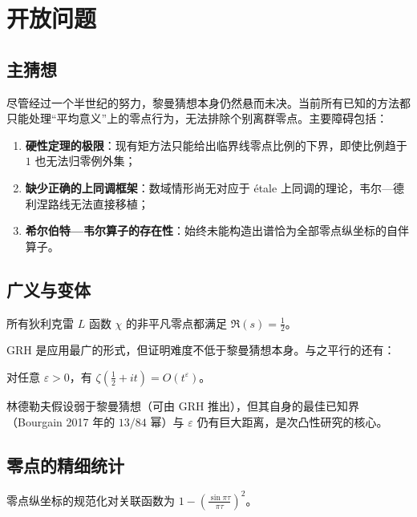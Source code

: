 \section{开放问题}\label{sec:open_problems}

\subsection{主猜想}

尽管经过一个半世纪的努力，黎曼猜想本身仍然悬而未决。当前所有已知的方法都只能处理“平均意义”上的零点行为，无法排除个别离群零点。主要障碍包括：

\begin{enumerate}[label=(\arabic*)]
    \item \textbf{硬性定理的极限}：现有矩方法只能给出临界线零点比例的下界，即使比例趋于 $1$ 也无法归零例外集；
    \item \textbf{缺少正确的上同调框架}：数域情形尚无对应于 étale 上同调的理论，韦尔—德利涅路线无法直接移植；
    \item \textbf{希尔伯特—韦尔算子的存在性}：始终未能构造出谱恰为全部零点纵坐标的自伴算子。
\end{enumerate}

\subsection{广义与变体}

\begin{conjecture}[广义黎曼假设]
    所有狄利克雷 $L$ 函数 $\chi$ 的非平凡零点都满足 $\Re(s) = \tfrac{1}{2}$。
\end{conjecture}

GRH 是应用最广的形式，但证明难度不低于黎曼猜想本身。与之平行的还有：

\begin{conjecture}[林德勒夫假设]
    对任意 $\varepsilon > 0$，有 $\zeta(\tfrac{1}{2}+it) = O(t^{\varepsilon})$。
\end{conjecture}

林德勒夫假设弱于黎曼猜想（可由 GRH 推出），但其自身的最佳已知界（Bourgain 2017 年的 $13/84$ 幂\cite{bourgain2017decoupling}）与 $\varepsilon$ 仍有巨大距离，是次凸性研究的核心。

\subsection{零点的精细统计}

\begin{conjecture}[蒙哥马利对关联猜想]
    零点纵坐标的规范化对关联函数为 $1 - \left(\frac{\sin \pi\tau}{\pi\tau}\right)^2$。
\end{conjecture}

